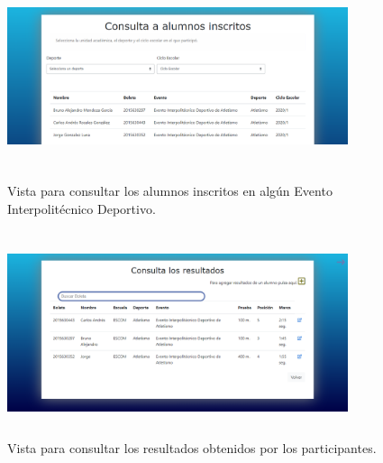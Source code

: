 		\begin{figure} [hbt!]
			\centering
			\includegraphics[width=10cm, height=6cm]{Imagenes/Vistas/Vista18_ConsultaInscritos}
			\caption{Vista para consultar los alumnos inscritos en algún Evento Interpolitécnico Deportivo.}
			\label{VistaConsultaInscritos}
		\end{figure}
		
		\begin{figure} [hbt!]
			\centering
			\includegraphics[width=10cm, height=6cm]{Imagenes/Vistas/Vista19_ConsultaResultados}
			\caption{Vista para consultar los resultados obtenidos por los participantes.}
			\label{VistaConsultaResultados}
		\end{figure}
				
		
